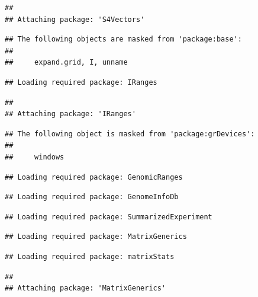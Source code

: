 \documentclass[
]{article}
\begin{document}
\begin{verbatim}
## 
## Attaching package: 'S4Vectors'
\end{verbatim}

\begin{verbatim}
## The following objects are masked from 'package:base':
## 
##     expand.grid, I, unname
\end{verbatim}

\begin{verbatim}
## Loading required package: IRanges
\end{verbatim}

\begin{verbatim}
## 
## Attaching package: 'IRanges'
\end{verbatim}

\begin{verbatim}
## The following object is masked from 'package:grDevices':
## 
##     windows
\end{verbatim}

\begin{verbatim}
## Loading required package: GenomicRanges
\end{verbatim}

\begin{verbatim}
## Loading required package: GenomeInfoDb
\end{verbatim}

\begin{verbatim}
## Loading required package: SummarizedExperiment
\end{verbatim}

\begin{verbatim}
## Loading required package: MatrixGenerics
\end{verbatim}

\begin{verbatim}
## Loading required package: matrixStats
\end{verbatim}

\begin{verbatim}
## 
## Attaching package: 'MatrixGenerics'
\end{verbatim}
\end{document}
